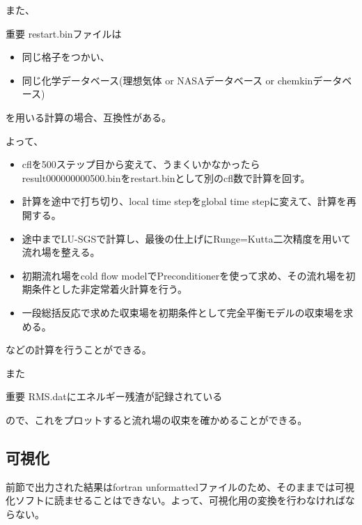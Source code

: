 \documentclass{jsarticle}
\begin{document}
また、
\begin{itembox}[l]{重要}
restart.binファイルは
\begin{itemize}
\item 同じ格子をつかい、
\item 同じ化学データベース(理想気体 or NASAデータベース or chemkinデータベース)
\end{itemize}
を用いる計算の場合、互換性がある。
\end{itembox}
よって、
\begin{itemize}
\item cflを500ステップ目から変えて、うまくいかなかったらresult000000000500.binをrestart.binとして別のcfl数で計算を回す。
\item 計算を途中で打ち切り、local time stepをglobal time stepに変えて、計算を再開する。
\item 途中までLU-SGSで計算し、最後の仕上げにRunge=Kutta二次精度を用いて流れ場を整える。
\item 初期流れ場をcold flow modelでPreconditionerを使って求め、その流れ場を初期条件とした非定常着火計算を行う。
\item 一段総括反応で求めた収束場を初期条件として完全平衡モデルの収束場を求める。
\end{itemize}
などの計算を行うことができる。

\hspace{1em}

また
\begin{itembox}[l]{重要}
RMS.datにエネルギー残渣が記録されている
\end{itembox}
ので、これをプロットすると流れ場の収束を確かめることができる。
\subsection{可視化}%
前節で出力された結果はfortran unformattedファイルのため、そのままでは可視化ソフトに読ませることはできない。よって、可視化用の変換を行わなければならない。
\end{document}
